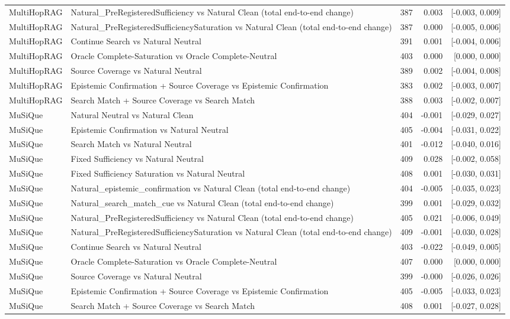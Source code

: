 \begin{table}[t]
\begin{tabular}{llrrr}
MultiHopRAG & Natural\_PreRegisteredSufficiency vs Natural Clean (total end-to-end change) & 387 & 0.003 & [-0.003, 0.009] \\
MultiHopRAG & Natural\_PreRegisteredSufficiencySaturation vs Natural Clean (total end-to-end change) & 387 & 0.000 & [-0.005, 0.006] \\
MultiHopRAG & Continue Search vs Natural Neutral & 391 & 0.001 & [-0.004, 0.006] \\
MultiHopRAG & Oracle Complete-Saturation vs Oracle Complete-Neutral & 403 & 0.000 & [0.000, 0.000] \\
MultiHopRAG & Source Coverage vs Natural Neutral & 389 & 0.002 & [-0.004, 0.008] \\
MultiHopRAG & Epistemic Confirmation + Source Coverage vs Epistemic Confirmation & 383 & 0.002 & [-0.003, 0.007] \\
MultiHopRAG & Search Match + Source Coverage vs Search Match & 388 & 0.003 & [-0.002, 0.007] \\
MuSiQue & Natural Neutral vs Natural Clean & 404 & -0.001 & [-0.029, 0.027] \\
MuSiQue & Epistemic Confirmation vs Natural Neutral & 405 & -0.004 & [-0.031, 0.022] \\
MuSiQue & Search Match vs Natural Neutral & 401 & -0.012 & [-0.040, 0.016] \\
MuSiQue & Fixed Sufficiency vs Natural Neutral & 409 & 0.028 & [-0.002, 0.058] \\
MuSiQue & Fixed Sufficiency Saturation vs Natural Neutral & 408 & 0.001 & [-0.030, 0.031] \\
MuSiQue & Natural\_epistemic\_confirmation vs Natural Clean (total end-to-end change) & 404 & -0.005 & [-0.035, 0.023] \\
MuSiQue & Natural\_search\_match\_cue vs Natural Clean (total end-to-end change) & 399 & 0.001 & [-0.029, 0.032] \\
MuSiQue & Natural\_PreRegisteredSufficiency vs Natural Clean (total end-to-end change) & 405 & 0.021 & [-0.006, 0.049] \\
MuSiQue & Natural\_PreRegisteredSufficiencySaturation vs Natural Clean (total end-to-end change) & 409 & -0.001 & [-0.030, 0.028] \\
MuSiQue & Continue Search vs Natural Neutral & 403 & -0.022 & [-0.049, 0.005] \\
MuSiQue & Oracle Complete-Saturation vs Oracle Complete-Neutral & 407 & 0.000 & [0.000, 0.000] \\
MuSiQue & Source Coverage vs Natural Neutral & 399 & -0.000 & [-0.026, 0.026] \\
MuSiQue & Epistemic Confirmation + Source Coverage vs Epistemic Confirmation & 405 & -0.005 & [-0.033, 0.023] \\
MuSiQue & Search Match + Source Coverage vs Search Match & 408 & 0.001 & [-0.027, 0.028] \\
\bottomrule
\end{tabular}
\end{table}

